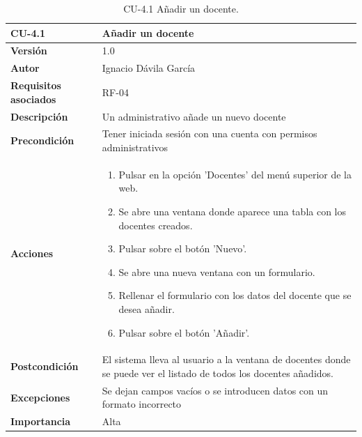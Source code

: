 \begin{table}[p]
	\centering
	\begin{tabularx}{\linewidth}{ p{} p{} }
		\toprule
		\textbf{CU-4.1}    & \textbf{Añadir un docente}\\
		\toprule
		\textbf{Versión}              & 1.0    \\
		\textbf{Autor}                & Ignacio Dávila García \\
		\textbf{Requisitos asociados} & RF-04 \\
		\textbf{Descripción}          & Un administrativo añade un nuevo docente \\
		\textbf{Precondición}         & Tener iniciada sesión con una cuenta con permisos administrativos \\
		\textbf{Acciones}             &
		\begin{enumerate}
			\def\labelenumi{\arabic{enumi}.}
			\tightlist
			\item Pulsar en la opción 'Docentes' del menú superior de la web.
			\item Se abre una ventana donde aparece una tabla con los docentes creados.
			\item Pulsar sobre el botón 'Nuevo'.
			\item Se abre una nueva ventana con un formulario.
			\item Rellenar el formulario con los datos del docente que se desea añadir.
			\item Pulsar sobre el botón 'Añadir'.
		\end{enumerate}\\
		\textbf{Postcondición}        & El sistema lleva al usuario a la ventana de docentes donde se puede ver el listado de todos los docentes añadidos. \\
		\textbf{Excepciones}          & Se dejan campos vacíos o se introducen datos con un formato incorrecto \\
		\textbf{Importancia}          & Alta \\
		\bottomrule
	\end{tabularx}
	\caption{CU-4.1 Añadir un docente.}
\end{table}

